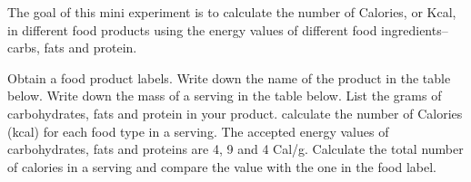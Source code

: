 \documentclass[main.tex]{subfiles}
\begin{document}
\newpage
\begin{fullwidth}
\vspace{0.2cm}{\large \bfseries 2. Food value in food}
The goal of this mini experiment is to calculate the number of Calories, or Kcal, in different food products using the energy values of different food ingredients--carbs, fats and protein.
\begin{steps}
    \newstep[] Obtain a food product labels.
        \newstep[]  Write down the name of the product in the table below.
        \newstep[]  Write down the mass of a serving in the table below.
        \newstep[]  List the grams of carbohydrates, fats and protein in your product.
                \newstep[]  calculate the number of Calories (kcal) for each food type in a serving. The accepted energy values of carbohydrates, fats and proteins are 4, 9 and 4 Cal/g.
                \newstep[] Calculate the total number of calories in a serving and compare the value with the one in the food label. 
\end{steps}


\end{fullwidth}
\end{document}
